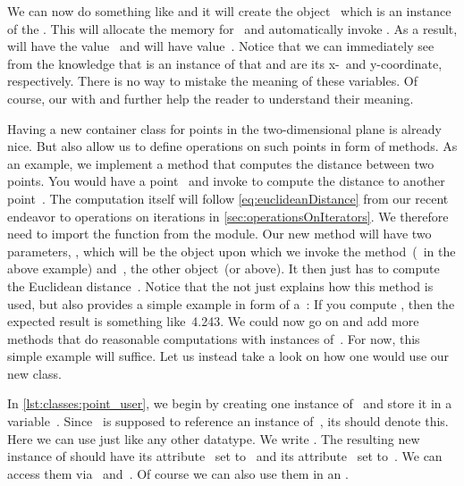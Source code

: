 %
We can now do something like  and it will create the object~ which is an instance of the  .
This will allocate the memory for~ and automatically invoke .
As a result,  will have the value~ and  will have value~.
Notice that we can immediately see from the knowledge that  is an instance of  that  and  are its x\nobreakdashes-\ and y\nobreakdashes-coordinate, respectively.
There is no way to mistake the meaning of these variables.
Of course, our  with  and  further help the reader to understand their meaning.

Having a new container class for points in the two-dimensional plane is already nice.
But  also allow us to define operations on such points in form of methods.
As an example, we implement a method  that computes the distance between two points.
You would have a point~ and invoke  to compute the distance to another point~.
The computation itself will follow \cref{eq:euclideanDistance} from our recent endeavor to operations on iterations in \cref{sec:operationsOnIterators}.
We therefore need to import the  function from the  module.
Our new method  will have two parameters, , which will be the object upon which we invoke the method~(~in the above example) and~, the other object~(or  above).
It then just has to compute the Euclidean distance~.
Notice that the  not just explains how this method is used, but also provides a simple example in form of a~:
If you compute , then the expected result is something like~4.243.%
%
%
%
We could now go on and add more methods that do reasonable computations with instances of~.
For now, this simple example will suffice.
Let us instead take a look on how one would use our new class.

In \cref{lst:classes:point_user}, we begin by creating one instance of~ and store it in a variable~.
Since~ is supposed to reference an instance of~, its  should denote this.
Here we can use  just like any other datatype.
We write .
The resulting new instance of  should have its attribute~ set to~ and its attribute~ set to~.
We can access them via~ and~.
Of course we can also use them in an .

